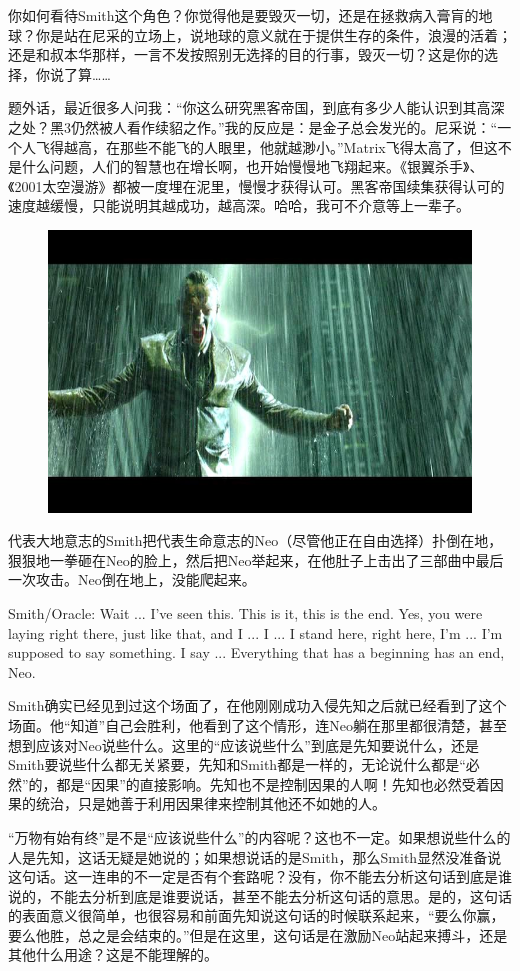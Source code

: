 \documentclass[UTF8]{ctexart}
\newenvironment{myquote}{\color{green} \setlength{\leftskip}{6em} \setlength{\rightskip}{4em} \setlength{\parindent}{-2em}}{\par}
\begin{document}
你如何看待Smith这个角色？你觉得他是要毁灭一切，还是在拯救病入膏肓的地球？你是站在尼采的立场上，说地球的意义就在于提供生存的条件，浪漫的活着；还是和叔本华那样，一言不发按照别无选择的目的行事，毁灭一切？这是你的选择，你说了算……

题外话，最近很多人问我：“你这么研究黑客帝国，到底有多少人能认识到其高深之处？黑3仍然被人看作续貂之作。”我的反应是：是金子总会发光的。尼采说：“一个人飞得越高，在那些不能飞的人眼里，他就越渺小。”Matrix飞得太高了，但这不是什么问题，人们的智慧也在增长啊，也开始慢慢地飞翔起来。《银翼杀手》、《2001太空漫游》都被一度埋在泥里，慢慢才获得认可。黑客帝国续集获得认可的速度越缓慢，只能说明其越成功，越高深。哈哈，我可不介意等上一辈子。

\begin{figure}[htb]
\centering
\includegraphics[width=0.5\linewidth]{fig/b21d9f2fa9bcf63b1e30897f.jpg}
\end{figure}

代表大地意志的Smith把代表生命意志的Neo（尽管他正在自由选择）扑倒在地，狠狠地一拳砸在Neo的脸上，然后把Neo举起来，在他肚子上击出了三部曲中最后一次攻击。Neo倒在地上，没能爬起来。

\begin{myquote}
Smith/Oracle: Wait ... I've seen this. This is it, this is the end. Yes, you were laying right there, just like that, and I ... I ... I stand here, right here, I'm ... I'm supposed to say something. I say ... Everything that has a beginning has an end, Neo.
\end{myquote}

Smith确实已经见到过这个场面了，在他刚刚成功入侵先知之后就已经看到了这个场面。他“知道”自己会胜利，他看到了这个情形，连Neo躺在那里都很清楚，甚至想到应该对Neo说些什么。这里的“应该说些什么”到底是先知要说什么，还是Smith要说些什么都无关紧要，先知和Smith都是一样的，无论说什么都是“必然”的，都是“因果”的直接影响。先知也不是控制因果的人啊！先知也必然受着因果的统治，只是她善于利用因果律来控制其他还不如她的人。

“万物有始有终”是不是“应该说些什么”的内容呢？这也不一定。如果想说些什么的人是先知，这话无疑是她说的；如果想说话的是Smith，那么Smith显然没准备说这句话。这一连串的不一定是否有个套路呢？没有，你不能去分析这句话到底是谁说的，不能去分析到底是谁要说话，甚至不能去分析这句话的意思。是的，这句话的表面意义很简单，也很容易和前面先知说这句话的时候联系起来，“要么你赢，要么他胜，总之是会结束的。”但是在这里，这句话是在激励Neo站起来搏斗，还是其他什么用途？这是不能理解的。
\end{document}
